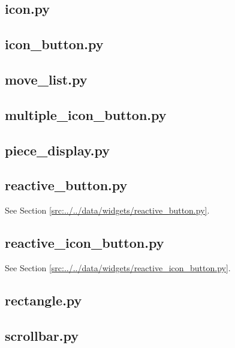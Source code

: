 \documentclass[../main/main.tex]{subfiles}
\begin{document}
\subsection{icon.py}

\label{src:data/widgets/icon.py}

\subsection{icon\_button.py}

\label{src:data/widgets/icon_button.py}

\subsection{move\_list.py}

\label{src:data/widgets/move_list.py}

\subsection{multiple\_icon\_button.py}

\label{src:data/widgets/multiple_icon_button.py}

\subsection{piece\_display.py}

\label{src:data/widgets/piece_display.py}

\subsection{reactive\_button.py}
See Section \ref{src:../../data/widgets/reactive_button.py}.

\subsection{reactive\_icon\_button.py}
See Section \ref{src:../../data/widgets/reactive_icon_button.py}.

\subsection{rectangle.py}

\label{src:data/widgets/rectangle.py}

\subsection{scrollbar.py}

\label{src:data/widgets/scrollbar.py}
\end{document}

